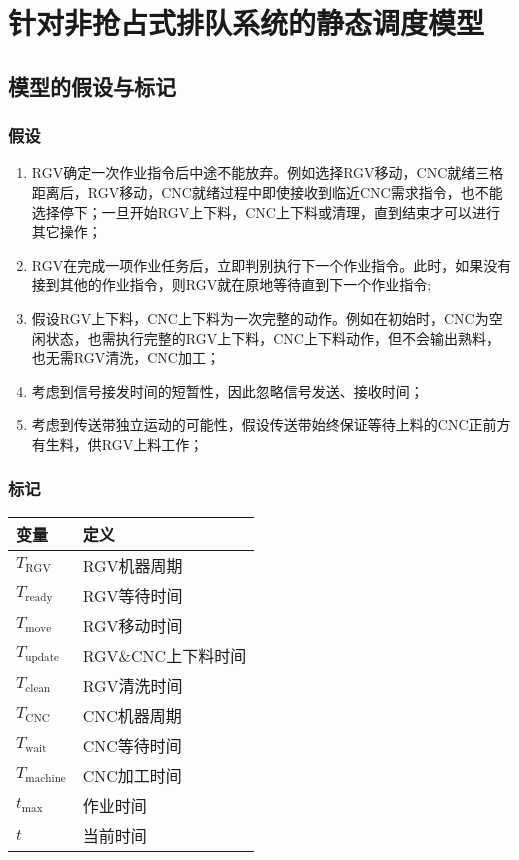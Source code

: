 \section{针对非抢占式排队系统的静态调度模型}
	\subsection{模型的假设与标记}
		\subsubsection{假设}
			\begin{enumerate}
				\item\label{抢占}RGV确定一次作业指令后中途不能放弃。例如选择RGV移动，CNC就绪三格距离后，RGV移动，CNC就绪过程中即使接收到临近CNC需求指令，也不能选择停下；一旦开始RGV上下料，CNC上下料或清理，直到结束才可以进行其它操作；
				\item\label{静态调度}RGV在完成一项作业任务后，立即判别执行下一个作业指令。此时，如果没有接到其他的作业指令，则RGV就在原地等待直到下一个作业指令;
				\item\label{机器周期1}假设RGV上下料，CNC上下料为一次完整的动作。例如在初始时，CNC为空闲状态，也需执行完整的RGV上下料，CNC上下料动作，但不会输出熟料，也无需RGV清洗，CNC加工；
				\item\label{机器周期2}考虑到信号接发时间的短暂性，因此忽略信号发送、接收时间；
				\item\label{机器周期3}考虑到传送带独立运动的可能性，假设传送带始终保证等待上料的CNC正前方有生料，供RGV上料工作；
			\end{enumerate}
		\subsubsection{标记}
			\begin{table}[htbp]
				\centering
				\caption{标记：针对非抢占式排队系统的静态调度模型}
				\label{标记：针对非抢占式排队系统的静态调度模型}
				\begin{longtabu}to
					\toprule
					变量&定义\\\midrule
					\(T_\mathrm{RGV}\)&RGV机器周期\\
					\(T_\mathrm{ready}\)&RGV等待时间\\
					\(T_\mathrm{move}\)&RGV移动时间\\
					\(T_\mathrm{update}\)&RGV\&CNC上下料时间\\
					\(T_\mathrm{clean}\)&RGV清洗时间\\
					\(T_\mathrm{CNC}\)&CNC机器周期\\
					\(T_\mathrm{wait}\)&CNC等待时间\\
					\(T_\mathrm{machine}\)&CNC加工时间\\
					\(t_\mathrm{max}\)&作业时间\\
					\(t\)&当前时间\\\bottomrule
				\end{longtabu}
			\end{table}
